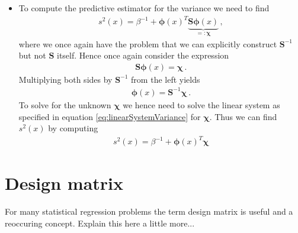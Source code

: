\documentclass[11pt, DINA4, fleqn]{amsart}
\begin{document}
\begin{itemize}
	\item To compute the predictive estimator for the variance we need to find
	\begin{align}
	s^2(x) = \beta^{-1} + \bm{\phi}(x)^T\underbrace{\bm{S}\bm{\phi}(x)}_{=:\bm{\chi}} \, ,
	\end{align}
	where we once again have the problem that we can explicitly construct $\bm{S}^{-1}$ but not $\bm{S}$ itself. Hence once again consider the expression
	\begin{align}
	\bm{S}\bm{\phi}(x) = \bm{\chi} \, .
	\end{align}
	Multiplying both sides by $\bm{S}^{-1}$ from the left yields
	\begin{align}
	\bm{\phi}(x) = \bm{S}^{-1}\bm{\chi} \, .
	\label{eq:linearSystemVariance}
	\end{align}
	To solve for the unknown $\bm{\chi}$ we hence need to solve the linear system as specified in equation \eqref{eq:linearSystemVariance} for $\bm{\chi}$. Thus we can find $s^2(x)$ by computing
	\begin{align}
	s^2(x) = \beta^{-1} + \bm{\phi}(x)^T\bm{\chi}
	\end{align}	
\end{itemize}

\section{Design matrix}
For many statistical regression problems the term design matrix is useful and a reoccuring concept. Explain this here a little more...
\end{document}
